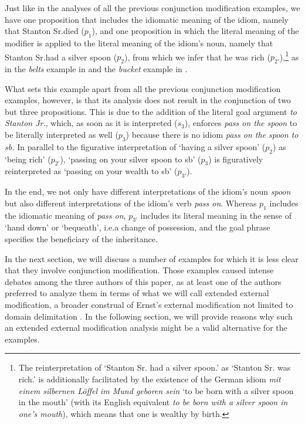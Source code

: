 \documentclass[output=paper]{langsci/langscibook}
\begin{document}
\noindent Just like in the analyses of all the previous conjunction modification examples, we have one proposition that includes the idiomatic meaning of the idiom, namely that Stanton Sr.\@ died ($p_{1}$), and one proposition in which the literal meaning of the modifier is applied to the literal meaning of the idiom's noun, namely that Stanton Sr.\@ had a silver spoon ($p_{2}$), from which we infer that he was rich ($p_{2'}$),\footnote{The reinterpretation of `Stanton Sr. had a silver spoon.' as `Stanton Sr. was rich.' is additionally facilitated by the existence of the German idiom \textit{mit einem silbernen Löffel im Mund geboren sein} `to be born with a silver spoon in the mouth' (with its English equivalent \textit{to be born with a silver spoon in one's mouth}), which means that one is wealthy by birth.} 
as in the \underline{} \textit{belts} example in  and the \underline{} \textit{bucket} example in .

What sets this example apart from all the previous conjunction modification examples, however, is that its analysis does not result in the conjunction of two but three propositions. This is due to the addition of the literal goal argument \textit{to Stanton Jr.}, which, as soon as it is interpreted ($s_{3}$), enforces \textit{pass on the spoon} to be literally interpreted as well ($p_{3}$) because there is no idiom \textit{pass on the spoon to sb.} In parallel to the figurative interpretation of `having a silver spoon' ($p_{2}$) as `being rich' ($p_{2'}$), `passing on your silver spoon to sb' ($p_{3}$) is figuratively reinterpreted as `passing on your wealth to sb' ($p_{3'}$).

In the end, we %
not only have different interpretations of the idiom's noun \textit{spoon} but also different interpretations of the idiom's verb \textit{pass on}. Whereas $p_{1}$ includes the idiomatic meaning of \textit{pass on}, $p_{3'}$ includes its literal meaning in the sense of `hand down' or `bequeath', i.e.\@ a change of possession, and the goal phrase specifies the beneficiary of the inheritance.

In the next section, we will discuss a number of examples for which it is less clear that they involve conjunction modification. Those examples caused intense debates among the three authors of this paper, as at least one of the authors preferred to analyze them in terms of what we will call extended external modification, a broader construal of Ernst's external modification not limited to domain delimitation \citep[cf.\@][Section 4.2, in which she argues for a similar approach whilst retaining Ernst's original term]{stathi07}. In the following section, we will provide reasons why such an extended external modification analysis might be a valid alternative for the examples.
\end{document}
